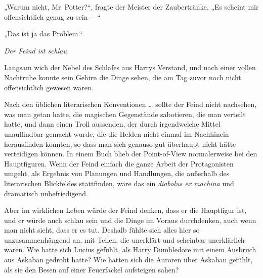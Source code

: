 „Warum nicht, Mr~Potter?“, fragte der Meister der Zaubertränke.
„Es scheint mir offensichtlich genug zu sein —“

„Das ist ja das Problem.“

\emph{Der Feind ist schlau.}

Langsam wich der Nebel des Schlafes aus Harrys Verstand, und nach einer vollen Nachtruhe konnte sein Gehirn die Dinge sehen, die am Tag zuvor noch nicht offensichtlich gewesen waren.

Nach den üblichen literarischen Konventionen … sollte der Feind nicht nachsehen, was man getan hatte, die magischen Gegenstände sabotieren, die man verteilt hatte, und dann einen Troll aussenden, der durch irgendwelche Mittel unauffindbar gemacht wurde, die die Helden nicht einmal im Nachhinein herausfinden konnten, so dass man sich genauso gut überhaupt nicht hätte verteidigen können. In einem Buch blieb der Point-of-View normalerweise bei den Hauptfiguren. Wenn der Feind einfach die ganze Arbeit der Protagonisten umgeht, als Ergebnis von Planungen und Handlungen, die außerhalb des literarischen Blickfeldes stattfinden, wäre das ein \emph{diabolus ex machina} und dramatisch unbefriedigend.

Aber im wirklichen Leben würde der Feind denken, dass er die Hauptfigur ist, und er würde auch schlau sein und die Dinge im Voraus durchdenken, auch wenn man nicht sieht, dass er es tut. Deshalb fühlte sich alles hier so unzusammenhängend an, mit Teilen, die unerklärt und scheinbar unerklärlich waren. Wie hatte sich Lucius gefühlt, als Harry Dumbledore mit einem Ausbruch aus Askaban gedroht hatte? Wie hatten sich die Auroren über Askaban gefühlt, als sie den Besen auf einer Feuerfackel aufsteigen sahen?

